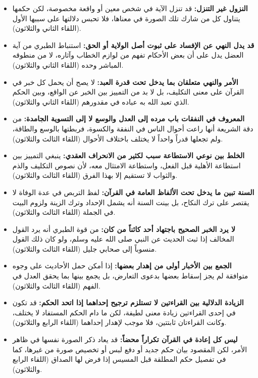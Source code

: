 \begin{itemize}
    \item \textbf{النزول غير التنزل:} قد تنزل الآية في شخص معين أو واقعة مخصوصة، لكن حكمها يتناول كل من شارك تلك الصورة في معناها، فلا تحبس دلالتها على سببها الأول (اللقاء الثاني والثلاثون).
    \item \textbf{قد يدل النهي عن الإفساد على ثبوت أصل الولاية أو الحق:} استنباط الطبري من آية العضل يدل على أن بعض الأحكام تفهم من لوازم الخطاب وآثاره، لا من منطوقه المباشر وحده (اللقاء الثاني والثلاثون).
    \item \textbf{الأمر والنهي متعلقان بما يدخل تحت قدرة العبد:} لا يصح أن يحمل كل خبر في القرآن على معنى التكليف، بل لا بد من التمييز بين الخبر عن الواقع، وبين الحكم الذي تعبد الله به عباده في مقدورهم (اللقاء الثاني والثلاثون).
    \item \textbf{المعروف في النفقات باب مرده إلى العدل والوسع لا إلى التسوية الجامدة:} من دقة الشريعة أنها راعت أحوال الناس في النفقة والكسوة، فربطتها بالوسع والطاقة، ولم تجعلها قدراً واحداً لا يختلف باختلاف الأحوال (اللقاء الثالث والثلاثون).
    \item \textbf{الخلط بين نوعي الاستطاعة سبب لكثير من الانحراف العقدي:} ينبغي التمييز بين استطاعة الأهلية قبل الفعل، واستطاعة الامتثال معه، لأن نصوص التكليف والذم والثواب لا تستقيم إلا بهذا الفرق (اللقاء الثالث والثلاثون).
    \item \textbf{السنة تبين ما يدخل تحت الألفاظ العامة في القرآن:} لفظ التربص في عدة الوفاة لا يقتصر على ترك النكاح، بل بينت السنة أنه يشمل الإحداد وترك الزينة ولزوم البيت في الجملة (اللقاء الثالث والثلاثون).
    \item \textbf{لا يرد الخبر الصحيح باجتهاد أحد كائناً من كان:} من قوة الطبري أنه يرد القول المخالف إذا ثبت الحديث عن النبي صلى الله عليه وسلم، ولو كان ذلك القول منسوباً إلى صحابي جليل (اللقاء الثالث والثلاثون).
    \item \textbf{الجمع بين الأخبار أولى من إهدار بعضها:} إذا أمكن حمل الأحاديث على وجوه متوافقة لم يجز إسقاط بعضها بدعوى التعارض، بل يجمع بينها بما يحقق العدل في الفهم (اللقاء الثالث والثلاثون).
    \item \textbf{الزيادة الدلالية بين القراءتين لا تستلزم ترجيح إحداهما إذا اتحد الحكم:} قد تكون في إحدى القراءتين زيادة معنى لطيفة، لكن ما دام الحكم المستفاد لا يختلف، وكانت القراءتان ثابتتين، فلا موجب لإهدار إحداهما (اللقاء الرابع والثلاثون).
    \item \textbf{ليس كل إعادة في القرآن تكراراً محضاً:} قد يعاد ذكر الصورة نفسها في ظاهر الأمر، لكن المقصود بيان حكم جديد أو دفع لبس أو تخصيص صورة من غيرها، كما في تفصيل حكم المطلقة قبل المسيس إذا فرض لها الصداق (اللقاء الرابع والثلاثون).

\end{itemize}

